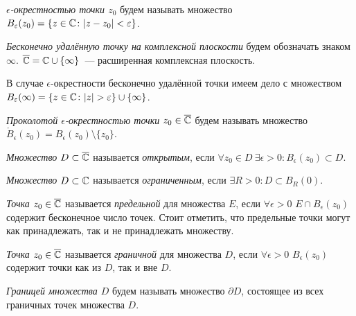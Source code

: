 
\begin{definition}
\textit{\(\epsilon\)-окрестностью точки \(z_0\)} будем называть множество \(B_\varepsilon(z_0) = \{z
\in \mathbb{C} \colon |z - z_0| < \varepsilon\}\).
\end{definition}

\begin{definition}
\textit{Бесконечно удалённую точку на комплексной плоскости} будем обозначать знаком \(\infty\).
\(\overline{\mathbb{C}} = \mathbb{C} \cup \{\infty\}\)~--- расширенная комплексная плоскость.
\end{definition}

В случае \(\epsilon\)-окрестности бесконечно удалённой точки имеем дело с множеством \(B_\varepsilon
(\infty) = \{z \in \mathbb{C} \colon |z| > \varepsilon\} \cup \{\infty\}\).

\begin{definition}
\textit{Проколотой \(\epsilon\)-окрестностью точки \(z_0 \in \overline{\mathbb{C}}\)} будем называть
множество \(\mathring{B}_\epsilon(z_0) = B_\epsilon(z_0) \setminus \{z_0\}\).
\end{definition}

\begin{definition}
\textit{Множество \(D \subset \overline{\mathbb{C}}\)} называется \textit{открытым}, если \(\forall z_0 \in D \
\exists \epsilon > 0 \colon B_\epsilon(z_0) \subset D\).
\end{definition}

\begin{definition}
\textit{Множество \(D \subset \mathbb{C}\)} называется \textit{ограниченным}, если \(\exists R > 0 \colon
D \subset B_R(0)\).
\end{definition}

\begin{definition}
\textit{Точка \(z_0 \in \overline{\mathbb{C}}\)} называется \textit{предельной} для множества \(E\), если \(\forall
\epsilon > 0\) \(E \cap B_\epsilon(z_0)\) содержит бесконечное число точек. Стоит 
отметить, что предельные точки могут как принадлежать, так и не принадлежать множеству.
\end{definition}

\begin{definition}
\textit{Точка \(z_0 \in \overline{\mathbb{C}}\)} называется \textit{граничной} для множества \(D\), если \(\forall
\epsilon > 0\) \(B_\epsilon(z_0)\) содержит точки как из \(D\), так и вне \(D\).
\end{definition}

\begin{definition}
\textit{Границей множества \(D\)} будем называть множество \(\partial D\), состоящее из всех
граничных точек множества \(D\).
\end{definition}

